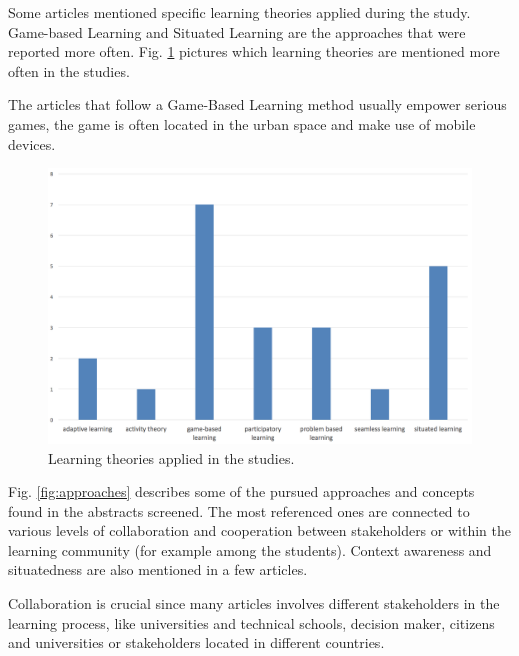 Some articles mentioned specific learning theories applied during the study. Game-based Learning and Situated Learning\cite{anderson_situated_1996} are the approaches that were reported more often.
Fig. \ref{fig:learn_theories} pictures which learning theories are mentioned more often in the studies.

The articles that follow a Game-Based Learning method usually empower serious games\cite{poplin_digital_2014-2}, the game is often located in the urban space and make use of mobile devices\cite{huizenga_cognitive_2008}.

\begin{figure}[htb]
\centering
\includegraphics[width=12cm]{img/learning_theories}
\caption{Learning theories applied in the studies.}
\label{fig:learn_theories}
\end{figure}

Fig. \ref{fig:approaches} describes some of the pursued approaches and concepts found in the abstracts screened.
The most referenced ones are connected to various levels of collaboration and cooperation between stakeholders or within the learning community (for example among the students). Context awareness and situatedness are also mentioned in a few articles.

Collaboration is crucial since many articles involves different stakeholders in the learning process, like universities and technical schools\cite{lee_platform_2011}, decision maker, citizens and universities\cite{evans_give_2014} or stakeholders located in different countries\cite{ross_facilitating_2009}\cite{severengiz_enhancing_2015}.

